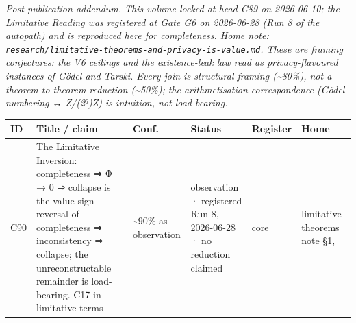 \documentclass[
  11pt,
]{article}
\newcounter{none} %
\begin{document}
\emph{Post-publication addendum. This volume locked at head C89 on
2026-06-10; the Limitative Reading was registered at Gate G6 on
2026-06-28 (Run 8 of the autopath) and is reproduced here for
completeness. Home note:
\texttt{research/limitative-theorems-and-privacy-is-value.md}. These are
framing conjectures: the V6 ceilings and the existence-leak law read as
privacy-flavoured instances of Gödel and Tarski. Every join is
structural framing (\textasciitilde80\%), not a theorem-to-theorem
reduction (\textasciitilde50\%); the arithmetisation correspondence
(Gödel numbering ↔ Z/(2⁶)Z) is intuition, not load-bearing.}

{\def\LTcaptype{none} %
\begin{longtable}[]{@{}
  >{\raggedright\arraybackslash}p{}
  >{\raggedright\arraybackslash}p{}
  >{\raggedright\arraybackslash}p{}
  >{\raggedright\arraybackslash}p{}
  >{\raggedright\arraybackslash}p{}
  >{\raggedright\arraybackslash}p{}@{}}
\toprule\noalign{}
\begin{minipage}[b]{\linewidth}\raggedright
ID
\end{minipage} & \begin{minipage}[b]{\linewidth}\raggedright
Title / claim
\end{minipage} & \begin{minipage}[b]{\linewidth}\raggedright
Conf.
\end{minipage} & \begin{minipage}[b]{\linewidth}\raggedright
Status
\end{minipage} & \begin{minipage}[b]{\linewidth}\raggedright
Register
\end{minipage} & \begin{minipage}[b]{\linewidth}\raggedright
Home
\end{minipage} \\
\midrule\noalign{}
\endhead
\bottomrule\noalign{}
\endlastfoot
C90 & The Limitative Inversion: completeness ⇒ Φ → 0 ⇒ collapse is the
value-sign reversal of completeness ⇒ inconsistency ⇒ collapse; the
unreconstructable remainder is load-bearing. C17 in limitative terms &
\textasciitilde90\% as observation & observation · registered Run 8,
2026-06-28 · no reduction claimed & core & limitative-theorems note §1,

\end{longtable}}
\end{document}
